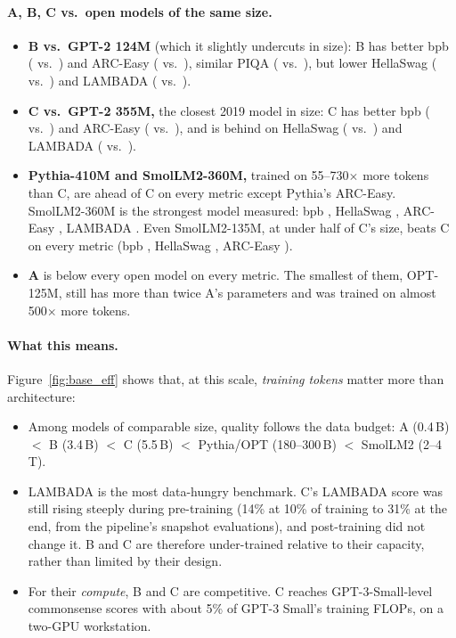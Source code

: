 \documentclass[10pt,a4paper]{article}
\begin{document}
\paragraph{A, B, C vs.\ open models of the same size.}
\begin{itemize}
  \item \textbf{B vs.\ GPT-2 124M} (which it slightly undercuts in size): B has better bpb (\meanbpbB{} vs.\ \bpbgptTwo) and ARC-Easy (\arceasyB{} vs.\ \arcgptTwo), similar PIQA (\piqaB{} vs.\ \piqagptTwo), but lower HellaSwag (\hellaswagB{} vs.\ \hsgptTwo) and LAMBADA (\lambadaB{} vs.\ \lambgptTwo).
  \item \textbf{C vs.\ GPT-2 355M,} the closest 2019 model in size: C has better bpb (\meanbpbC{} vs.\ \bpbgptTwoMed) and ARC-Easy (\arceasyC{} vs.\ \arcgptTwoMed), and is behind on HellaSwag (\hellaswagC{} vs.\ \hsgptTwoMed) and LAMBADA (\lambadaC{} vs.\ \lambgptTwoMed).
  \item \textbf{Pythia-410M and SmolLM2-360M,} trained on 55--730$\times$ more tokens than C, are ahead of C on every metric except Pythia's ARC-Easy. SmolLM2-360M is the strongest model measured: bpb \bpbsmolM, HellaSwag \hssmolM, ARC-Easy \arcsmolM, LAMBADA \lambsmolM. Even SmolLM2-135M, at under half of C's size, beats C on every metric (bpb \bpbsmolS, HellaSwag \hssmolS, ARC-Easy \arcsmolS).
  \item \textbf{A} is below every open model on every metric. The smallest of them, OPT-125M, still has more than twice A's parameters and was trained on almost 500$\times$ more tokens.
\end{itemize}

\paragraph{What this means.}
Figure~\ref{fig:base_eff} shows that, at this scale, \emph{training tokens} matter more than architecture:
\begin{itemize}
  \item Among models of comparable size, quality follows the data budget: A (0.4\,B) $<$ B (3.4\,B) $<$ C (5.5\,B) $<$ Pythia/OPT (180--300\,B) $<$ SmolLM2 (2--4\,T).
  \item LAMBADA is the most data-hungry benchmark. C's LAMBADA score was still rising steeply during pre-training (14\% at 10\% of training to 31\% at the end, from the pipeline's snapshot evaluations), and post-training did not change it. B and C are therefore under-trained relative to their capacity, rather than limited by their design.
  \item For their \emph{compute}, B and C are competitive. C reaches GPT-3-Small-level commonsense scores with about 5\% of GPT-3 Small's training FLOPs, on a two-GPU workstation.
\end{itemize}
\end{document}
